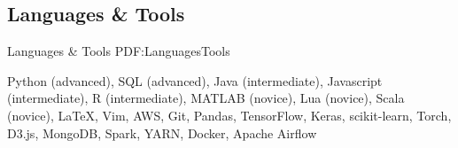 \documentclass[letterpaper,9.5pt,oneside]{article}
\newcommand{\CVNote}{CV compiled on {\today}}
\begin{document}
\begin{body}
\BigGap



\section
{Languages \& Tools}
{Languages \& Tools}
{PDF:LanguagesTools}

Python (advanced), SQL (advanced), Java (intermediate), Javascript (intermediate), R (intermediate), MATLAB (novice), Lua (novice), Scala (novice), LaTeX, Vim, AWS, Git, Pandas, TensorFlow, Keras, scikit-learn, Torch, D3.js, MongoDB, Spark, YARN, Docker, Apache Airflow


\end{body}
\label{LastPage}%
\end{document}
